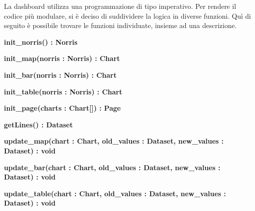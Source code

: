 
        La dashboard utilizza una programmazione di tipo imperativo. Per rendere il codice più modulare, si è deciso di suddividere la logica in diverse funzioni. Quì di seguito è possibile trovare le funzioni individuate, insieme ad una descrizione.

        \begin{description}
            \item \textbf{init\_norris() : Norris}
            \item \textbf{init\_map(norris : Norris) : Chart}
            \item \textbf{init\_bar(norris : Norris) : Chart}
            \item \textbf{init\_table(norris : Norris) : Chart}
            \item \textbf{init\_page(charts : Chart[]) : Page}
            \item \textbf{getLines() : Dataset}
            \item \textbf{update\_map(chart : Chart, old\_values : Dataset, new\_values : Dataset) : void}
            \item \textbf{update\_bar(chart : Chart, old\_values : Dataset, new\_values : Dataset) : void}
            \item \textbf{update\_table(chart : Chart, old\_values : Dataset, new\_values : Dataset) : void}
        \end{description}